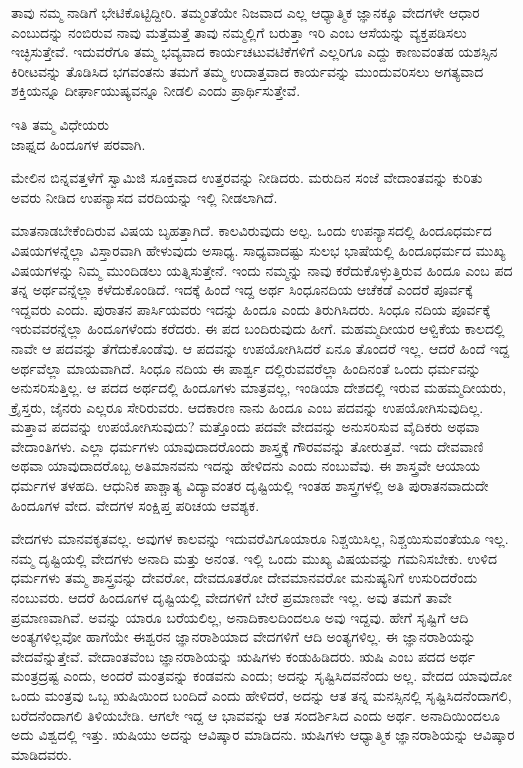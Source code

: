 ತಾವು ನಮ್ಮ ನಾಡಿಗೆ ಭೇಟಿಕೊಟ್ಟಿದ್ದೀರಿ. ತಮ್ಮಂತೆಯೇ ನಿಜವಾದ ಎಲ್ಲ ಆಧ್ಯಾತ್ಮಿಕ ಜ್ಞಾನಕ್ಕೂ ವೇದಗಳೇ ಆಧಾರ ಎಂಬುದನ್ನು ನಂಬಿರುವ ನಾವು ಮತ್ತೆ\break ಮತ್ತೆ ತಾವು ನಮ್ಮಲ್ಲಿಗೆ ಬರುತ್ತಾ ಇರಿ ಎಂಬ ಆಸೆಯನ್ನು ವ್ಯಕ್ತಪಡಿಸಲು ಇಚ್ಛಿಸುತ್ತೇವೆ. ಇದುವರೆಗೂ ತಮ್ಮ ಭವ್ಯವಾದ ಕಾರ್ಯಚಟುವಟಿಕೆಗಳಿಗೆ ಎಲ್ಲರಿಗೂ ಎದ್ದು ಕಾಣುವಂತಹ ಯಶಸ್ಸಿನ ಕಿರೀಟವನ್ನು ತೊಡಿಸಿದ ಭಗವಂತನು ತಮಗೆ ತಮ್ಮ ಉದಾತ್ತವಾದ ಕಾರ್ಯವನ್ನು ಮುಂದುವರಿಸಲು ಅಗತ್ಯವಾದ ಶಕ್ತಿಯನ್ನೂ ದೀರ್ಘಾ\-ಯುಷ್ಯವನ್ನೂ ನೀಡಲಿ ಎಂದು ಪ್ರಾರ್ಥಿಸುತ್ತೇವೆ.

\begin{flushright}
ಇತಿ ತಮ್ಮ ವಿಧೇಯರು\\ಜಾಫ್ನದ ಹಿಂದೂಗಳ ಪರವಾಗಿ. 
\end{flushright}

ಮೇಲಿನ ಬಿನ್ನವತ್ತಳೆಗೆ ಸ್ವಾಮಿಜಿ ಸೂಕ್ತವಾದ ಉತ್ತರವನ್ನು ನೀಡಿದರು. ಮರುದಿನ ಸಂಜೆ ವೇದಾಂತವನ್ನು ಕುರಿತು ಅವರು ನೀಡಿದ ಉಪನ್ಯಾಸದ ವರದಿಯನ್ನು ಇಲ್ಲಿ ನೀಡಲಾಗಿದೆ. 

ಮಾತನಾಡಬೇಕೆಂದಿರುವ ವಿಷಯ ಬೃಹತ್ತಾಗಿದೆ. ಕಾಲವಿರುವುದು ಅಲ್ಪ. ಒಂದು ಉಪನ್ಯಾಸದಲ್ಲಿ ಹಿಂದೂಧರ್ಮದ ವಿಷಯಗಳನ್ನೆಲ್ಲಾ ವಿಸ್ತಾರವಾಗಿ ಹೇಳುವುದು ಅಸಾಧ್ಯ. ಸಾಧ್ಯವಾದಷ್ಟು ಸುಲಭ ಭಾಷೆಯಲ್ಲಿ ಹಿಂದೂಧರ್ಮದ ಮುಖ್ಯ ವಿಷಯಗಳನ್ನು ನಿಮ್ಮ ಮುಂದಿಡಲು ಯತ್ನಿಸುತ್ತೇನೆ. ಇಂದು ನಮ್ಮನ್ನು ನಾವು ಕರೆದುಕೊಳ್ಳುತ್ತಿರುವ ಹಿಂದೂ ಎಂಬ ಪದ ತನ್ನ ಅರ್ಥವನ್ನೆಲ್ಲಾ ಕಳೆದುಕೊಂಡಿದೆ. ಇದಕ್ಕೆ ಹಿಂದೆ ಇದ್ದ ಅರ್ಥ ಸಿಂಧೂನದಿಯ ಆಚೆಕಡೆ ಎಂದರೆ ಪೂರ್ವಕ್ಕೆ ಇದ್ದವರು ಎಂದು. ಪುರಾತನ ಪಾರ್ಸಿಯವರು ಇದನ್ನು ಹಿಂದೂ ಎಂದು ತಿರುಗಿಸಿದರು. ಸಿಂಧೂ ನದಿಯ ಪೂರ್ವಕ್ಕೆ ಇರುವವರನ್ನೆಲ್ಲಾ ಹಿಂದೂಗಳೆಂದು ಕರೆದರು. ಈ ಪದ ಬಂದಿರುವುದು ಹೀಗೆ. ಮಹಮ್ಮದೀಯರ ಆಳ್ವಿಕೆಯ ಕಾಲದಲ್ಲಿ ನಾವೇ ಆ ಪದವನ್ನು ತೆಗೆದುಕೊಂಡೆವು. ಆ ಪದವನ್ನು ಉಪಯೋಗಿಸಿದರೆ ಏನೂ ತೊಂದರೆ ಇಲ್ಲ. ಆದರೆ ಹಿಂದೆ ಇದ್ದ ಅರ್ಥವೆಲ್ಲಾ ಮಾಯವಾಗಿದೆ. ಸಿಂಧೂ ನದಿಯ ಈ ಪಾರ್ಶ್ವ ದಲ್ಲಿರುವವರೆಲ್ಲಾ ಹಿಂದಿನಂತೆ ಒಂದು ಧರ್ಮವನ್ನು ಅನುಸರಿಸುತ್ತಿಲ್ಲ. ಆ ಪದದ ಅರ್ಥದಲ್ಲಿ ಹಿಂದೂಗಳು ಮಾತ್ರವಲ್ಲ, ಇಂಡಿಯಾ ದೇಶದಲ್ಲಿ ಇರುವ ಮಹಮ್ಮದೀಯರು, ಕ್ರೈಸ್ತರು, ಜೈನರು ಎಲ್ಲರೂ ಸೇರಿರುವರು. ಆದಕಾರಣ ನಾನು ಹಿಂದೂ ಎಂಬ ಪದವನ್ನು ಉಪಯೋಗಿಸುವುದಿಲ್ಲ. ಮತ್ತಾವ ಪದವನ್ನು ಉಪಯೋಗಿಸುವುದು? ಮತ್ತೊಂದು ಪದವೇ ವೇದವನ್ನು ಅನುಸರಿಸುವ ವೈದಿಕರು ಅಥವಾ ವೇದಾಂತಿಗಳು. ಎಲ್ಲಾ ಧರ್ಮಗಳು ಯಾವುದಾದರೊಂದು ಶಾಸ್ತ್ರಕ್ಕೆ ಗೌರವವನ್ನು ತೋರುತ್ತವೆ. ಇದು ದೇವವಾಣಿ ಅಥವಾ ಯಾವುದಾದರೊಬ್ಬ ಅತಿಮಾನವನು ಇದನ್ನು ಹೇಳಿದನು ಎಂದು ನಂಬುವೆವು. ಈ ಶಾಸ್ತ್ರವೇ ಆಯಾಯ ಧರ್ಮಗಳ ತಳಹದಿ. ಆಧುನಿಕ ಪಾಶ್ಚಾತ್ಯ ವಿದ್ಯಾವಂತರ ದೃಷ್ಟಿಯಲ್ಲಿ ಇಂತಹ ಶಾಸ್ತ್ರಗಳಲ್ಲಿ ಅತಿ ಪುರಾತನವಾದುದೇ ಹಿಂದೂಗಳ ವೇದ. ವೇದಗಳ ಸಂಕ್ಷಿಪ್ತ ಪರಿಚಯ ಆವಶ್ಯಕ. 

ವೇದಗಳು ಮಾನವಕೃತವಲ್ಲ. ಅವುಗಳ ಕಾಲವನ್ನು ಇದುವರೆವಿಗೂಯಾರೂ ನಿಶ್ಚಯಿಸಿಲ್ಲ, ನಿಶ್ಚಯಿಸುವಂತೆಯೂ ಇಲ್ಲ. ನಮ್ಮ ದೃಷ್ಟಿಯಲ್ಲಿ ವೇದಗಳು ಅನಾದಿ ಮತ್ತು ಅನಂತ. ಇಲ್ಲಿ ಒಂದು ಮುಖ್ಯ ವಿಷಯವನ್ನು ಗಮನಿಸಬೇಕು. ಉಳಿದ ಧರ್ಮಗಳು ತಮ್ಮ ಶಾಸ್ತ್ರವನ್ನು ದೇವರೋ, ದೇವದೂತರೋ ದೇವಮಾನವರೋ ಮನುಷ್ಯನಿಗೆ ಉಸುರಿದರೆಂದು ನಂಬುವರು. ಆದರೆ ಹಿಂದೂಗಳ ದೃಷ್ಟಿಯಲ್ಲಿ ವೇದಗಳಿಗೆ ಬೇರೆ ಪ್ರಮಾಣವೇ ಇಲ್ಲ. ಅವು ತಮಗೆ ತಾವೇ ಪ್ರಮಾಣವಾಗಿವೆ. ಅವನ್ನು ಯಾರೂ ಬರೆಯಲಿಲ್ಲ, ಅನಾದಿಕಾಲದಿಂದಲೂ ಅವು ಇದ್ದವು. ಹೇಗೆ ಸೃಷ್ಟಿಗೆ ಆದಿ ಅಂತ್ಯಗಳಿಲ್ಲವೋ ಹಾಗೆಯೇ ಈಶ್ವರನ ಜ್ಞಾನರಾಶಿಯಾದ ವೇದಗಳಿಗೆ ಆದಿ ಅಂತ್ಯಗಳಿಲ್ಲ. ಈ ಜ್ಞಾನರಾಶಿಯನ್ನು ವೇದವೆನ್ನುತ್ತೇವೆ. ವೇದಾಂತವೆಂಬ ಜ್ಞಾನರಾಶಿಯನ್ನು ಋಷಿಗಳು ಕಂಡುಹಿಡಿದರು. ಋಷಿ ಎಂಬ ಪದದ ಅರ್ಥ ಮಂತ್ರದ್ರಷ್ಟ ಎಂದು, ಅಂದರೆ ಮಂತ್ರವನ್ನು ಕಂಡವನು ಎಂದು; ಅದನ್ನು ಸೃಷ್ಟಿಸಿದವನೆಂದು ಅಲ್ಲ. ವೇದದ ಯಾವುದೋ ಒಂದು ಮಂತ್ರವು ಒಬ್ಬ ಋಷಿಯಿಂದ ಬಂದಿದೆ ಎಂದು ಹೇಳಿದರೆ, ಅದನ್ನು ಆತ ತನ್ನ ಮನಸ್ಸಿನಲ್ಲಿ ಸೃಷ್ಟಿಸಿದನೆಂದಾಗಲಿ, ಬರೆದನೆಂದಾಗಲಿ ತಿಳಿಯಬೇಡಿ. ಆಗಲೇ ಇದ್ದ ಆ ಭಾವವನ್ನು ಆತ ಸಂದರ್ಶಿಸಿದ ಎಂದು ಅರ್ಥ. ಅನಾದಿಯಿಂದಲೂ ಅದು ವಿಶ್ವದಲ್ಲಿ ಇತ್ತು. ಋಷಿಯು ಅದನ್ನು ಆವಿಷ್ಕಾರ ಮಾಡಿದನು. ಋಷಿಗಳು ಆಧ್ಯಾತ್ಮಿಕ ಜ್ಞಾನರಾಶಿಯನ್ನು ಆವಿಷ್ಕಾರ ಮಾಡಿದವರು. 


